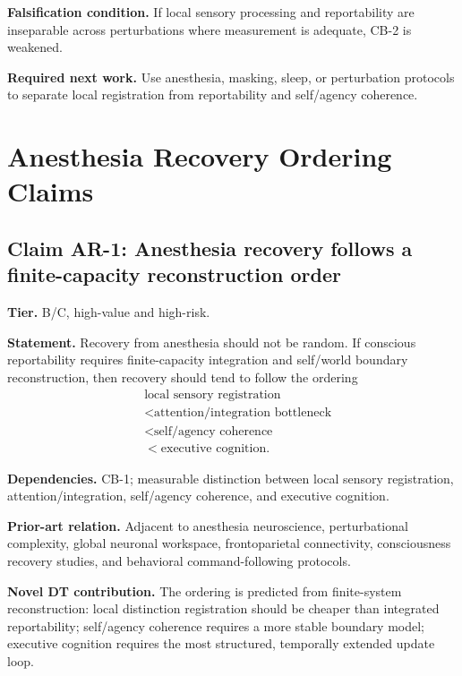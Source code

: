 \documentclass[10pt,a4paper,twocolumn,aps,prl]{revtex4-2}
\theoremstyle{claimstyle}
\theoremstyle{definition}
\newcommand{\claimfield}[1]{\noindent\textbf{#1.}}
\begin{document}
\claimfield{Falsification condition} If local sensory processing and reportability are inseparable across perturbations where measurement is adequate, CB-2 is weakened.

\claimfield{Required next work} Use anesthesia, masking, sleep, or perturbation protocols to separate local registration from reportability and self/agency coherence.

\section{Anesthesia Recovery Ordering Claims}

\subsection{Claim AR-1: Anesthesia recovery follows a finite-capacity reconstruction order}

\claimfield{Tier} B/C, high-value and high-risk.

\claimfield{Statement} Recovery from anesthesia should not be random. If conscious reportability requires finite-capacity integration and self/world boundary reconstruction, then recovery should tend to follow the ordering
\begin{equation}
\begin{aligned}
&\text{local sensory registration}\\
&<\text{attention/integration bottleneck}\\
&<\text{self/agency coherence}\\
&<\text{executive cognition}.
\end{aligned}
\end{equation}

\claimfield{Dependencies} CB-1; measurable distinction between local sensory registration, attention/integration, self/agency coherence, and executive cognition.

\claimfield{Prior-art relation} Adjacent to anesthesia neuroscience, perturbational complexity, global neuronal workspace, frontoparietal connectivity, consciousness recovery studies, and behavioral command-following protocols.

\claimfield{Novel DT contribution} The ordering is predicted from finite-system reconstruction: local distinction registration should be cheaper than integrated reportability; self/agency coherence requires a more stable boundary model; executive cognition requires the most structured, temporally extended update loop.
\end{document}
